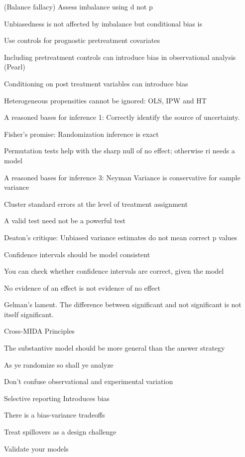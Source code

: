\documentclass[11pt]{article}
\begin{document}
\begin{legal}
\begin{legal}
    \begin{legal}
		\item (Balance fallacy) Assess imbalance using d not p
		\item 	Unbiasedness is not affected by imbalance but conditional bias is
		\item 	Use controls for prognostic pretreatment covariates
		\item 	Including pretreatment controls can introduce bias in observational analysis (Pearl)
		\item 	Conditioning on post treatment variables can introduce bias
		\item 	Heterogeneous propensities cannot be ignored:  OLS, IPW and HT
		\item 	A reasoned bases for inference 1:  Correctly identify the source of uncertainty. 
		\item 	Fisher's promise: Randomization inference is exact
		\item 	Permutation tests help with the sharp null of no effect; otherwise ri needs a model
		\item 	A reasoned bases for inference 3:  Neyman Variance is conservative for sample variance
		\item 	Cluster standard errors at the level of treatment assignment
		\item	A valid test need not be a powerful test 
		\item	Deaton's critique: Unbiased variance estimates do not mean correct p values
		\item	Confidence intervals should be model consistent
		\item	You can check whether confidence intervals are correct, given the model 
		\item	No evidence of an effect is not evidence of no effect
		\item	Gelman's lament. The difference between significant and not significant is not itself significant.
		\end{legal}
		
		\item Cross-MIDA Principles
		
		\begin{legal}
		\item	The substantive model should be more general than the answer strategy
		\item	As ye randomize so shall ye analyze
		\item	Don’t confuse observational and experimental variation
		\item	Selective reporting Introduces bias
		\item	There is a bias-variance tradeoffs
		\item	Treat spillovers as a design challenge
		\item	Validate your models
		\end{legal}
	\end{legal}
	

\end{legal}
\end{document}

